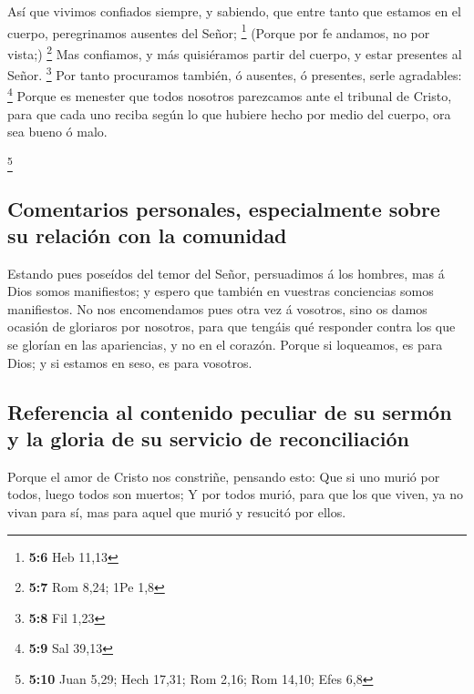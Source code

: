  Así que vivimos confiados siempre, y sabiendo, que entre
tanto que estamos en el cuerpo, peregrinamos ausentes del Señor;
\footnote{\textbf{5:6} Heb 11,13}  (Porque por fe andamos,
no por vista;) \footnote{\textbf{5:7} Rom 8,24; 1Pe 1,8} 
Mas confiamos, y más quisiéramos partir del cuerpo, y estar presentes al
Señor. \footnote{\textbf{5:8} Fil 1,23}  Por tanto
procuramos también, ó ausentes, ó presentes, serle agradables:
\footnote{\textbf{5:9} Sal 39,13}  Porque es menester que
todos nosotros parezcamos ante el tribunal de Cristo, para que cada uno
reciba según lo que hubiere hecho por medio del cuerpo, ora sea bueno ó
malo.

\footnote{\textbf{5:10} Juan 5,29; Hech 17,31; Rom 2,16; Rom 14,10; Efes
  6,8}

\hypertarget{comentarios-personales-especialmente-sobre-su-relaciuxf3n-con-la-comunidad}{%
\subsection{Comentarios personales, especialmente sobre su relación con
la
comunidad}\label{comentarios-personales-especialmente-sobre-su-relaciuxf3n-con-la-comunidad}}

 Estando pues poseídos del temor del Señor, persuadimos á
los hombres, mas á Dios somos manifiestos; y espero que también en
vuestras conciencias somos manifiestos.  No nos
encomendamos pues otra vez á vosotros, sino os damos ocasión de
gloriaros por nosotros, para que tengáis qué responder contra los que se
glorían en las apariencias, y no en el corazón.  Porque si
loqueamos, es para Dios; y si estamos en seso, es para vosotros.

\hypertarget{referencia-al-contenido-peculiar-de-su-sermuxf3n-y-la-gloria-de-su-servicio-de-reconciliaciuxf3n}{%
\subsection{Referencia al contenido peculiar de su sermón y la gloria de
su servicio de
reconciliación}\label{referencia-al-contenido-peculiar-de-su-sermuxf3n-y-la-gloria-de-su-servicio-de-reconciliaciuxf3n}}

 Porque el amor de Cristo nos constriñe, pensando esto: Que
si uno murió por todos, luego todos son muertos;  Y por
todos murió, para que los que viven, ya no vivan para sí, mas para aquel
que murió y resucitó por ellos.

